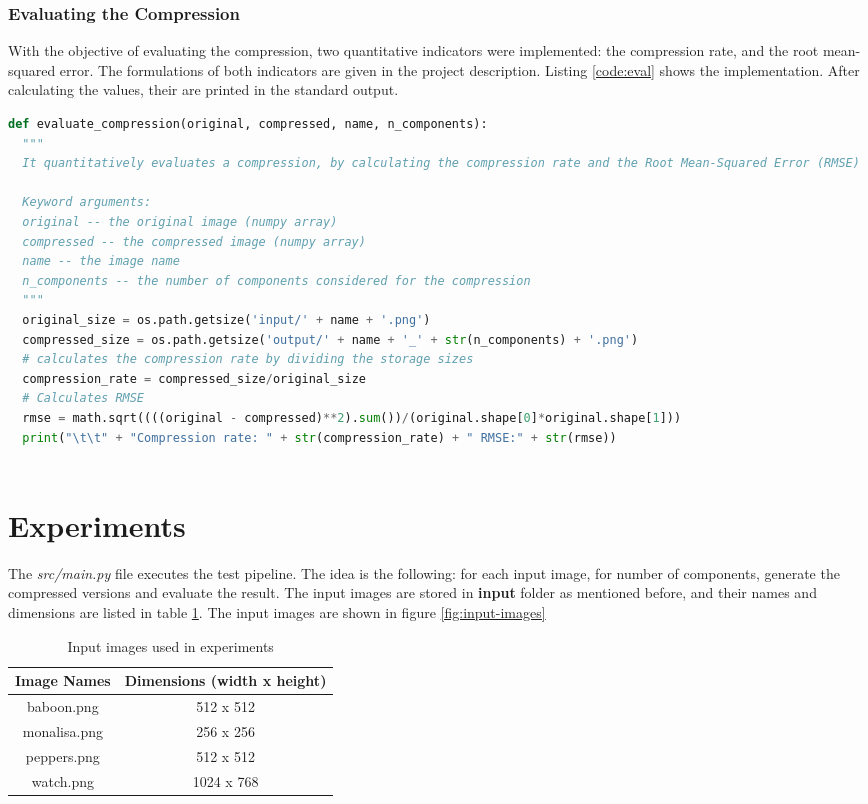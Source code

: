\documentclass[]{IEEEtran}
\begin{document}
\subsubsection{Evaluating the Compression}
With the objective of evaluating the compression, two quantitative indicators were implemented: the compression rate, and the root mean-squared error. The formulations of both indicators are given in the project description\cite{PROJECT:5}. Listing \ref{code:eval} shows the implementation. After calculating the values, their are printed in the standard output.

\begin{lstlisting}[language=Python, caption={Evaluation of Compressed Images}, label={code:eval}]
def evaluate_compression(original, compressed, name, n_components):
  """
  It quantitatively evaluates a compression, by calculating the compression rate and the Root Mean-Squared Error (RMSE)

  Keyword arguments:
  original -- the original image (numpy array)
  compressed -- the compressed image (numpy array)
  name -- the image name
  n_components -- the number of components considered for the compression
  """
  original_size = os.path.getsize('input/' + name + '.png')
  compressed_size = os.path.getsize('output/' + name + '_' + str(n_components) + '.png')
  # calculates the compression rate by dividing the storage sizes
  compression_rate = compressed_size/original_size
  # Calculates RMSE
  rmse = math.sqrt((((original - compressed)**2).sum())/(original.shape[0]*original.shape[1])) 
  print("\t\t" + "Compression rate: " + str(compression_rate) + " RMSE:" + str(rmse))
  
  \end{lstlisting}

\section{Experiments}
The \textit{src/main.py} file executes the test pipeline. The idea is the following: for each input image, for number of components, generate the compressed versions and evaluate the result. The input images are stored in \textbf{input} folder as mentioned before, and their names and dimensions are listed in table \ref{table:input}. The input images are shown in figure \ref{fig:input-images}

\begin{table}[h!]
\centering
\begin{center}
\begin{tabular}{ |c|c| } 
 \hline
 Image Names & Dimensions (width x height) \\
 \hline
  baboon.png &  512 x 512\\ 
 \hline
  monalisa.png & 256 x 256\\
 \hline
  peppers.png &  512 x 512\\ 
 \hline
  watch.png & 1024 x 768\\
 \hline
\end{tabular}
\caption{Input images used in experiments}
\label{table:input}
\end{center}
\end{table}
\end{document}
